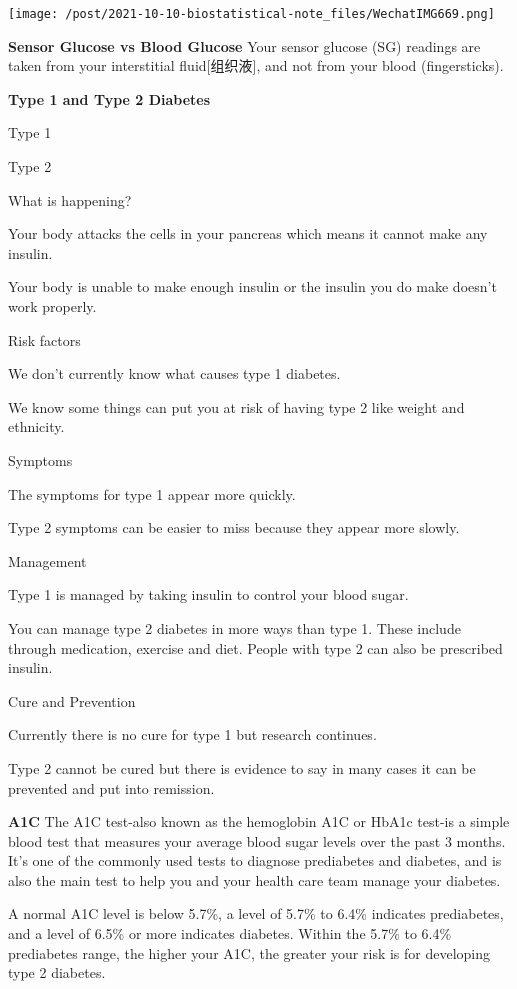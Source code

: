 \documentclass[
]{ctexart}
\begin{document}
\texttt{[image: /post/2021-10-10-biostatistical-note\_files/WechatIMG669.png]}

\textbf{Sensor Glucose vs Blood Glucose} Your sensor glucose (SG)
readings are taken from your interstitial fluid{[}组织液{]}, and not
from your blood (fingersticks).

\textbf{Type 1 and Type 2 Diabetes}

Type 1

Type 2

What is happening?

Your body attacks the cells in your pancreas which means it cannot make
any insulin.

Your body is unable to make enough insulin or the insulin you do make
doesn't work properly.

Risk factors

We don't currently know what causes type 1 diabetes.

We know some things can put you at risk of having type 2 like weight and
ethnicity.

Symptoms

The symptoms for type 1 appear more quickly.

Type 2 symptoms can be easier to miss because they appear more slowly.

Management

Type 1 is managed by taking insulin to control your blood sugar.

You can manage type 2 diabetes in more ways than type 1. These include
through medication, exercise and diet. People with type 2 can also be
prescribed insulin.

Cure and Prevention

Currently there is no cure for type 1 but research continues.

Type 2 cannot be cured but there is evidence to say in many cases it can
be prevented and put into remission.

\textbf{A1C} The A1C test-also known as the hemoglobin A1C or HbA1c
test-is a simple blood test that measures your average blood sugar
levels over the past 3 months. It's one of the commonly used tests to
diagnose prediabetes and diabetes, and is also the main test to help you
and your health care team manage your diabetes.

A normal A1C level is below 5.7\%, a level of 5.7\% to 6.4\% indicates
prediabetes, and a level of 6.5\% or more indicates diabetes. Within the
5.7\% to 6.4\% prediabetes range, the higher your A1C, the greater your
risk is for developing type 2 diabetes.
\end{document}

